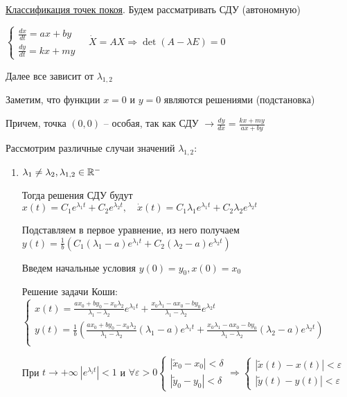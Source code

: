 \documentclass[12pt]{article}
\begin{document}
    \underline{Классификация точек покоя}. Будем рассматривать СДУ (автономную)

    $\begin{cases}\frac{dx}{dt} = ax + by \\ \frac{dy}{dt} = kx + my\end{cases} \quad
    \dot X = AX \Longrightarrow \det(A - \lambda E) = 0$

    Далее все зависит от $\lambda_{1,2}$

    Заметим, что функции $x = 0$ и $y = 0$ являются решениями (подстановка)

    Причем, точка $(0, 0)$ -- особая, так как СДУ $\to \frac{dy}{dx} = \frac{kx + my}{ax + by}$

    Рассмотрим различные случаи значений $\lambda_{1,2}$:

    \begin{enumerate}[label*=\arabic*) ]
        \item $\lambda_1 \neq \lambda_2, \lambda_{1,2} \in \mathbb{R}^-$

        Тогда решения СДУ будут $x(t) = C_1 e^{\lambda_1 t} + C_2 e^{\lambda_2 t}, \quad
        \dot x(t) = C_1 \lambda_1 e^{\lambda_1 t} + C_2 \lambda_2 e^{\lambda_2 t}$

        Подставляем в первое уравнение, из него получаем $y(t) = \frac{1}{b}(C_1 (\lambda_1 - a)e^{\lambda_1 t} + C_2 (\lambda_2 - a)e^{\lambda_2 t})$

        Введем начальные условия $y(0) = y_0, x(0) = x_0$

        Решение задачи Коши: $\begin{cases}x(t) = \frac{ax_0 + by_0 - x_0 \lambda_2}{\lambda_1 - \lambda_2} e^{\lambda_1 t} + \frac{x_0 \lambda_1 - ax_0 - by_0}{\lambda_1 - \lambda_2} e^{\lambda_2 t} \\
        y(t) = \frac{1}{b}(\frac{ax_0 + by_0 - x_0 \lambda_2}{\lambda_1 - \lambda_2} (\lambda_1 - a) e^{\lambda_1 t} + \frac{x_0 \lambda_1 - ax_0 - by_0}{\lambda_1 - \lambda_2} (\lambda_2 - a) e^{\lambda_2 t}) \\
        \end{cases}$

        При $t \to +\infty \ |e^{\lambda_i t}| < 1$ и $\forall \varepsilon > 0 \begin{cases}|\tilde{x}_0 - x_0| < \delta \\ |\tilde{y}_0 - y_0| < \delta\end{cases} \Longrightarrow
        \begin{cases}|\tilde{x}(t) - x(t)| < \varepsilon \\ |\tilde{y}(t) - y(t)| < \varepsilon\end{cases}$


\end{enumerate}
\end{document}
